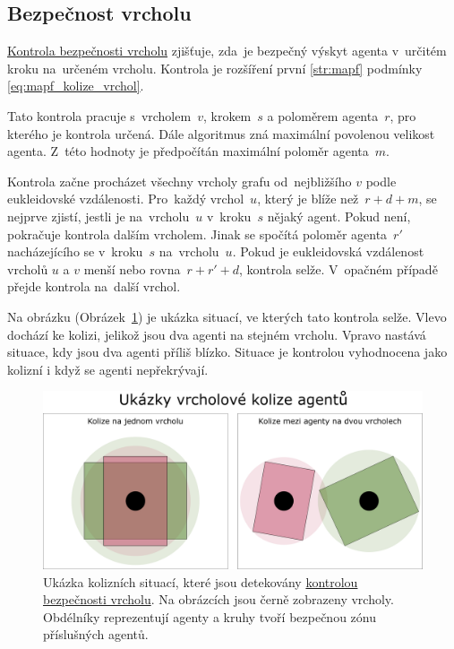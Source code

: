 \subsection{Bezpečnost vrcholu}\label{subsec:bezpecnost_vrcholu}


\hyperref[subsec:bezpecnost_vrcholu]{Kontrola bezpečnosti vrcholu} zjišťuje,
zda~je bezpečný výskyt agenta v~určitém kroku na~určeném vrcholu.
Kontrola je rozšíření první \ref{str:mapf} podmínky
 \eqref{eq:mapf_kolize_vrchol}.

Tato kontrola pracuje s~vrcholem~$v$, krokem~$s$ a poloměrem agenta~$r$, pro kterého je kontrola určená.
Dále algoritmus zná maximální povolenou velikost agenta.
Z~této hodnoty je předpočítán maximální poloměr agenta~$m$.

Kontrola začne procházet všechny vrcholy grafu od~nejbližšího $v$ podle eukleidovské vzdálenosti.
Pro~každý vrchol~$u$, který je blíže než~$r + d + m$, se nejprve zjistí,
jestli je na~vrcholu~$u$ v~kroku~$s$ nějaký agent.
Pokud není, pokračuje kontrola dalším vrcholem.
Jinak se spočítá poloměr agenta~$r'$ nacházejícího se v~kroku~$s$ na~vrcholu~$u$.
Pokud je eukleidovská vzdálenost vrcholů $u$ a $v$ menší nebo rovna~$r + r' + d$, kontrola selže.
V~opačném případě přejde kontrola na~další vrchol.

Na obrázku (Obrázek~\ref{fig:kolize_na_vrcholu}) je ukázka situací, ve kterých tato kontrola selže.
Vlevo dochází ke kolizi, jelikož jsou dva agenti na stejném vrcholu.
Vpravo nastává situace, kdy jsou dva agenti příliš blízko.
Situace je kontrolou vyhodnocena jako kolizní i když se agenti nepřekrývají.

\begin{figure}[h]
  \centering
  \includegraphics[width=\textwidth]{../img/kolize_vrchol}
  \caption{
    Ukázka kolizních situací, které jsou detekovány \hyperref[subsec:bezpecnost_vrcholu]{kontrolou bezpečnosti vrcholu}.
    Na obrázcích jsou černě zobrazeny vrcholy.
    Obdélníky reprezentují agenty a kruhy tvoří bezpečnou zónu příslušných agentů.
  }
  \label{fig:kolize_na_vrcholu}
\end{figure}

